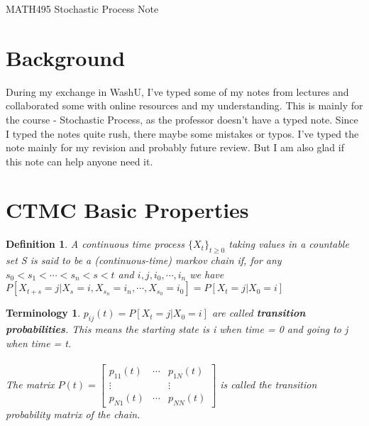\documentclass[12pt]{article}
\newtheorem{definition}{Definition}
\newtheorem{terminology}{Terminology}
\begin{document}

\begin{center}
    \Large MATH495 Stochastic Process Note
\end{center}

\section{Background}

During my exchange in WashU, I've typed some of my notes from lectures and collaborated some with online resources and my understanding. This is mainly for the course - Stochastic Process, as the professor doesn't have a typed note. Since I typed the notes quite rush, there maybe some mistakes or typos. I've typed the note mainly for my revision and probably future review. But I am also glad if this note can help anyone need it.

\section{CTMC Basic Properties} 

\begin{definition}
     A continuous time process $\{X_t\}_{t \geq 0}$ taking values in a countable set S is said to be a (continuous-time) markov chain if, for any $s_0 < s_1 < \cdots < s_n < s < t$ and $i ,j, i_0, \cdots , i_n$ we have $P[X_{t+s} = j | X_s = i, X_{s_n} = i_n, \cdots , X_{s_0} = i_0] = P[X_t = j | X_0 = i]$
\end{definition}

\begin{terminology}
    $p_{ij}(t) = P[X_t = j | X_0 = i]$ are called \textbf{transition probabilities}. This means the starting state is i when time = 0 and going to j when time = t. 
    \\
    \\The matrix $P(t) = \begin{bmatrix}
 p_{11}(t) & \cdots & p_{1N}(t)\\
 \vdots  &  & \vdots \\
 p_{N1}(t) & \cdots & p_{NN}(t)
\end{bmatrix}$ is called the transition probability matrix of the chain.
\end{terminology}
\end{document}
